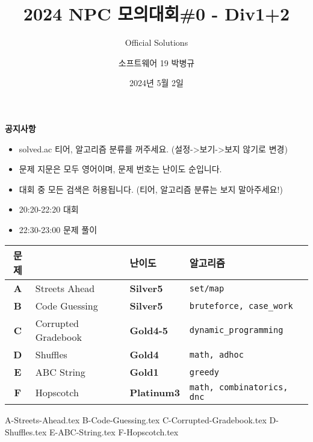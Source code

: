 
\usetikzlibrary{arrows.meta,matrix,decorations.pathreplacing}

\title{2024 NPC 모의대회\#0 - Div1+2}
\subtitle{Official Solutions}
\author{소프트웨어 19 박병규}
\date{2024년 5월 2일}


    \setcounter{framenumber}{-1}
    \frame{\titlepage}

    \begin{frame}{\textbf{공지사항}}
        \begin{itemize}
            \item solved.ac 티어, 알고리즘 분류를 꺼주세요. (설정->보기->보지 않기로 변경)
            \item 문제 지문은 모두 영어이며, 문제 번호는 난이도 순입니다.
            \item 대회 중 모든 검색은 허용됩니다. (티어, 알고리즘 분류는 보지 말아주세요!)
            \item 20:20-22:20 대회
            \item 22:30-23:00 문제 풀이
        \end{itemize}
    \end{frame}
        
    \begin{frame} %
        \begin{center}
            \begin{tabular}{cl|l|l}
                \hline
                문제 & & 난이도 & 알고리즘 \\
                \hline
                \hline
                \textbf{A} & Streets Ahead & \textbf{\color{acsilver}Silver5} & \texttt{set/map} \\
                \textbf{B} & Code Guessing & \textbf{\color{acsilver}Silver5} & \texttt{bruteforce, case\_work} \\
                \textbf{C} & Corrupted Gradebook & \textbf{\color{acgold}Gold4-5} & \texttt{dynamic\_programming} \\
                \textbf{D} & Shuffles & \textbf{\color{acgold}Gold4} & \texttt{math, adhoc} \\
                \textbf{E} & ABC String & \textbf{\color{acgold}Gold1} & \texttt{greedy} \\
                \textbf{F} & Hopscotch & \textbf{\color{acplatinum}Platinum3} & \texttt{math, combinatorics, dnc} \\
                \hline
            \end{tabular}
        \end{center}
    \end{frame}
    {A-Streets-Ahead.tex}
    {B-Code-Guessing.tex}
    {C-Corrupted-Gradebook.tex}
    {D-Shuffles.tex}
    {E-ABC-String.tex}
    {F-Hopscotch.tex}

